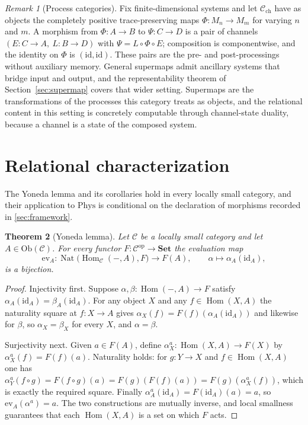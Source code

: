 \documentclass[11pt,letterpaper]{article}
\DeclareMathOperator{\Hom}{Hom}
\DeclareMathOperator{\Nat}{Nat}
\newtheorem{theorem}{Theorem}[section]
\theoremstyle{definition}
\theoremstyle{remark}
\newtheorem{remark}[theorem]{Remark}
\begin{document}
\begin{remark}[Process categories]
\label{ex:process}
Fix finite-dimensional systems and let $\mathcal{C}_{\mathrm{ch}}$ have as objects the completely positive trace-preserving maps $\Phi \colon M_n \to M_m$ for varying $n$ and $m$. A morphism from $\Phi \colon A \to B$ to $\Psi \colon C \to D$ is a pair of channels $(E \colon C \to A,\ L \colon B \to D)$ with $\Psi = L \circ \Phi \circ E$; composition is componentwise, and the identity on $\Phi$ is $(\mathrm{id}, \mathrm{id})$. These pairs are the pre- and post-processings without auxiliary memory. General supermaps admit ancillary systems that bridge input and output, and the representability theorem of Section~\ref{sec:supermap} covers that wider setting. Supermaps are the transformations of the processes this category treats as objects, and the relational content in this setting is concretely computable through channel-state duality, because a channel is a state of the composed system.
\end{remark}

\section{Relational characterization}
\label{sec:relational}

The Yoneda lemma and its corollaries \cite{maclane} hold in every locally small category, and their application to $\mathrm{Phys}$ is conditional on the declaration of morphisms recorded in \cref{sec:framework}.

\begin{theorem}[Yoneda lemma]
\label{thm:yoneda}
Let $\mathcal{C}$ be a locally small category and let $A \in \mathrm{Ob}(\mathcal{C})$. For every functor $F \colon \mathcal{C}^{\mathrm{op}} \to \mathbf{Set}$ the evaluation map
\[
\mathrm{ev}_A \colon \Nat\big(\Hom_{\mathcal{C}}(-, A), F\big) \longrightarrow F(A),
\qquad
\alpha \longmapsto \alpha_A(\mathrm{id}_A),
\]
is a bijection.
\end{theorem}

\begin{proof}
Injectivity first. Suppose $\alpha, \beta \colon \Hom(-, A) \to F$ satisfy $\alpha_A(\mathrm{id}_A) = \beta_A(\mathrm{id}_A)$. For any object $X$ and any $f \in \Hom(X, A)$ the naturality square at $f \colon X \to A$ gives $\alpha_X(f) = F(f)(\alpha_A(\mathrm{id}_A))$ and likewise for $\beta$, so $\alpha_X = \beta_X$ for every $X$, and $\alpha = \beta$.

Surjectivity next. Given $a \in F(A)$, define $\alpha^{a}_X \colon \Hom(X, A) \to F(X)$ by $\alpha^{a}_X(f) = F(f)(a)$. Naturality holds: for $g \colon Y \to X$ and $f \in \Hom(X, A)$ one has $\alpha^{a}_Y(f \circ g) = F(f \circ g)(a) = F(g)(F(f)(a)) = F(g)(\alpha^{a}_X(f))$, which is exactly the required square. Finally $\alpha^{a}_A(\mathrm{id}_A) = F(\mathrm{id}_A)(a) = a$, so $\mathrm{ev}_A(\alpha^{a}) = a$. The two constructions are mutually inverse, and local smallness guarantees that each $\Hom(X, A)$ is a set on which $F$ acts.
\end{proof}
\end{document}
